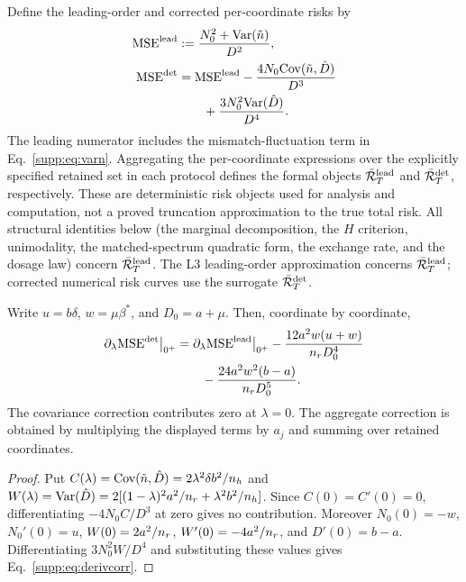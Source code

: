 Define the leading-order and corrected per-coordinate risks by
\begin{align}
  \mathrm{MSE}^{\mathrm{lead}} &:= \frac{N_0^2+\mathrm{Var}(\tilde n)}{D^2}, \notag\\
  \mathrm{MSE}^{\det} &= \mathrm{MSE}^{\mathrm{lead}}
  -\frac{4N_0\mathrm{Cov}(\tilde n,\hat D)}{D^3} \notag\\
  &\qquad +\frac{3N_0^2\mathrm{Var}(\hat D)}{D^4}.
  \label{supp:eq:lead-det}
\end{align}
The leading numerator includes the mismatch-fluctuation term in Eq.~\eqref{supp:eq:varn}.
Aggregating the per-coordinate expressions over the explicitly specified retained set in each protocol defines the formal objects $\bar{\mathcal{R}}_T^{\mathrm{lead}}$ and $\bar{\mathcal{R}}_T^{\det}$, respectively. These are deterministic risk objects used for analysis and computation, not a proved truncation approximation to the true total risk.
All structural identities below (the marginal decomposition, the $H$ criterion, unimodality, the matched-spectrum quadratic form, the exchange rate, and the dosage law) concern $\bar{\mathcal{R}}_T^{\mathrm{lead}}$.
The L3 leading-order approximation concerns $\bar{\mathcal{R}}_T^{\mathrm{lead}}$; corrected numerical risk curves use the surrogate $\bar{\mathcal{R}}_T^{\det}$.

\begin{proposition}
\label{supp:prop:derivcorr}
Write $u=b\delta$, $w=\mu\beta^*$, and $D_0=a+\mu$. Then, coordinate by coordinate,
\begin{align}
  \partial_\lambda\mathrm{MSE}^{\det}\big|_{0^+}
  &=\partial_\lambda\mathrm{MSE}^{\mathrm{lead}}\big|_{0^+}
  -\frac{12a^2w(u+w)}{n_r D_0^4} \notag\\
  &\qquad -\frac{24a^2w^2(b-a)}{n_r D_0^5}.
  \label{supp:eq:derivcorr}
\end{align}
The covariance correction contributes zero at $\lambda=0$.
The aggregate correction is obtained by multiplying the displayed terms by $a_j$ and summing over retained coordinates.
\end{proposition}

\begin{proof}
Put $C(\lambda)=\mathrm{Cov}(\tilde n,\hat D)=2\lambda^2\delta b^2/n_h$ and $W(\lambda)=\mathrm{Var}(\hat D)=2[(1-\lambda)^2a^2/n_r+\lambda^2b^2/n_h]$.
Since $C(0)=C'(0)=0$, differentiating $-4N_0C/D^3$ at zero gives no contribution.
Moreover $N_0(0)=-w$, $N_0'(0)=u$, $W(0)=2a^2/n_r$, $W'(0)=-4a^2/n_r$, and $D'(0)=b-a$.
Differentiating $3N_0^2W/D^4$ and substituting these values gives Eq.~\eqref{supp:eq:derivcorr}.
\end{proof}

